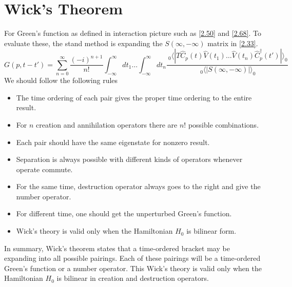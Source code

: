 \section{Wick's Theorem}\label{s2.4}
For Green's function as defined in interaction picture such as \eqref{2.50} and \eqref{2.68}.
To evaluate these, the stand method is expanding the $S(\infty,-\infty)$ matrix in \eqref{2.33}.
\begin{equation}
  G(p,t-t') = \sum_{n=0}^\infty \frac{(-i)^{n+1}}{n!} \int_{-\infty}^\infty dt_1 \dots \int_{-\infty}^\infty dt_n \frac{{~}_0\langle|T\hat{C}_p(t)\hat{V}(t_1)\dots\hat{V}(t_n)\hat{C}_p^\dagger(t')|\rangle_0}{{~}_0\langle|S(\infty, -\infty)|\rangle_0} \label{2.76}
\end{equation}
We should follow the following rules
\begin{itemize}
  \item The time ordering of each pair gives the proper time ordering to the entire result.
  \item For $n$ creation and annihilation operators there are $n!$ possible combinations.
  \item Each pair should have the same eigenstate for nonzero result.
  \item Separation is always possible with different kinds of operators whenever operate commute.
  \item For the same time, destruction operator always goes to the right and give the number operator.
  \item For different time, one should get the unperturbed Green's function.
  \item Wick's theory is valid only when the Hamiltonian $H_0$ is bilinear form.
\end{itemize}

In summary, Wick's theorem states that a time-ordered bracket may be expanding into all possible pairings.
Each of these pairings will be a time-ordered Green's function or a number operator.
This Wick's theory is valid only when the Hamiltonian $H_0$ is bilinear in creation and destruction operators.

